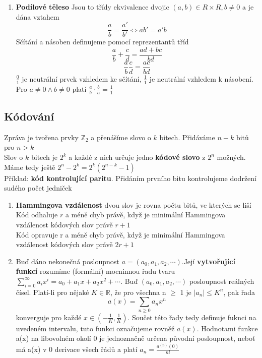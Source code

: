 \documentclass[12pt,a4paper]{article}
\begin{document}
\begin{enumerate}
			\item \textbf{Podílové těleso}
					Jsou to třídy ekvivalence dvojic $(a,b) \in R \times R, b \neq 0$ a je dána vztahem
					\[\frac{a}{b}=\frac{a'}{b'} \Leftrightarrow ab' = a'b\]
					Sčítání a násoben definujeme pomocí reprezentantů tříd
					\[\frac{a}{b}+\frac{c}{d} = \frac{ad + bc}{bd}  \]
					\[ \frac{a}{b}\frac{c}{d} = \frac{ac}{bd}\]
					$\frac{0}{1}$ je neutrální prvek vzhledem ke sčítání, $\frac{1}{1}$ je neutrální vzhledem k násobení.\\
					Pro $a \neq 0 \land b \neq 0$ platí $\frac{a}{b} \cdot \frac{b}{a} = \frac{1}{1}$	
	\end{enumerate}

	\subsection{Kódování}
		Zpráva je tvořena prvky $\mathbb{Z}_2$ a přenášíme slovo o $k$ bitech. Přidáváme $n-k$ bitů pro $n > k$\\
		Slov o $k$ bitech je $2^k$ a každé z nich určuje jedno \textbf{kódové slovo} z $2^n$ možných.\\
		Máme tedy ještě $2^n-2^k = 2^k(2^{n-k}-1)$\\
		Příklad: \textbf{kód kontrolující paritu}. Přidáním prvního bitu kontrolujeme dodržení sudého počet jedniček
	\begin{enumerate}
		\item \textbf{Hammingova vzdálenost} dvou slov je rovna počtu bitů, ve kterých se liší\\
			Kód odhaluje $r$ a méně chyb právě, když je minimální Hammingova vzdálenost kódových slov právě $r+1$\\
			Kód opravuje r a méně chyb právě, když je minimální Hammingova vzdálenost kódových slov právě $2r+1$
			

		
		
		\item Buď dáno nekonečná posloupnost $a=(a_0,a_1,a_2,\cdots)$.Její \textbf{vytvořující funkcí} rozumíme (formální) mocninnou řadu tvaru $\sum_{i=0}^{\infty}a_ix^i=a_0+a_1x+a_2x^2+\cdots$.
		\vspace{4mm}
		Buď $(a_0,a_1,a_2,\cdots)$ posloupnost reálných čísel. Platí-li pro nějaké $K \in \mathbb{R}$, že pro všechna n $\geq$ 1 je $|a_n|\leq K^n$, pak řada \[a(x)=\sum_{n\geq0}a_nx^n\] konverguje pro každé $x\in(-\frac{1}{K},\frac{1}{K})$. Součet této řady tedy definuje fuknci na uvedeném intervalu, tuto funkci označujeme rovněž $a(x)$. Hodnotami funkce a(x) na libovolném okolí 0 je jednoznačně určena původní posloupnost, neboť má a(x) v 0 derivace všech řádů a platí $a_n = \frac{a^{(n)}(0)}{n!}$
	\end{enumerate}
	
	
\end{document}

